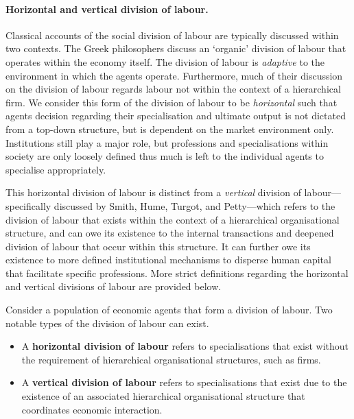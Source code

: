 \paragraph{Horizontal and vertical division of labour.}

Classical accounts of the social division of labour are typically discussed within two contexts. The Greek philosophers discuss an `organic' division of labour that operates within the economy itself. The division of labour is \emph{adaptive} to the environment in which the agents operate. Furthermore, much of their discussion on the division of labour regards labour not within the context of a hierarchical firm. We consider this form of the division of labour to be \emph{horizontal} such that agents decision regarding their specialisation and ultimate output is not dictated from a top-down structure, but is dependent on the market environment only. Institutions still play a major role, but professions and specialisations within society are only loosely defined thus much is left to the individual agents to specialise appropriately. 

This horizontal division of labour is distinct from a \emph{vertical} division of labour---specifically discussed by Smith, Hume, Turgot, and Petty---which refers to the division of labour that exists within the context of a hierarchical organisational structure, and can owe its existence to the internal transactions and deepened division of labour that occur within this structure. It can further owe its existence to more defined institutional mechanisms to disperse human capital that facilitate specific professions. More strict definitions regarding the horizontal and vertical divisions of labour are provided below.

\begin{definition}
Consider a population of economic agents that form a division of labour. Two notable types of the division of labour can exist.
\begin{itemize}
\item A \textbf{horizontal division of labour} refers to specialisations that exist without the requirement of hierarchical organisational structures, such as firms.
\item A \textbf{vertical division of labour} refers to specialisations that exist due to the existence of an associated hierarchical organisational structure that coordinates economic interaction.
\end{itemize}
\end{definition}

